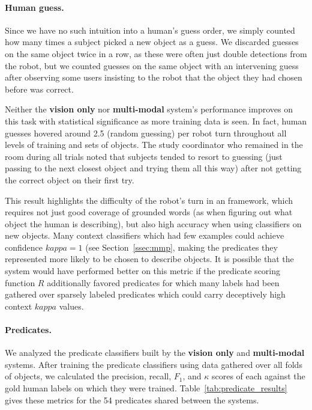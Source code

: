 \paragraph{Human guess.}
Since we have no such intuition into a human's guess order, we simply counted how many times a subject picked a new object as a guess.
We discarded guesses on the same object twice in a row, as these were often just double detections from the robot, but we counted guesses on the same object with an intervening guess after observing some users insisting to the robot that the object they had chosen before was correct.

Neither the \textbf{vision only} nor \textbf{multi-modal} system's performance improves on this task with statistical significance as more training data is seen.
In fact, human guesses hovered around 2.5 (random guessing) per robot turn throughout all levels of training and sets of objects.
The study coordinator who remained in the room during all trials noted that subjects tended to resort to guessing (just passing to the next closest object and trying them all this way) after not getting the correct object on their first try.

This result highlights the difficulty of the robot's turn in an \ispy framework, which requires not just good coverage of grounded words (as when figuring out what object the human is describing), but also high accuracy when using classifiers on new objects.
Many context classifiers which had few examples could achieve confidence $kappa=1$ (see Section~\ref{ssec:mmp}, making the predicates they represented more likely to be chosen to describe objects.
It is possible that the system would have performed better on this metric if the predicate scoring function $R$ additionally favored predicates for which many labels had been gathered over sparsely labeled predicates which could carry deceptively high context $kappa$ values.

\paragraph{Predicates.}
We analyzed the predicate classifiers built by the \textbf{vision only} and \textbf{multi-modal} systems.
After training the predicate classifiers using data gathered over all folds of objects, we calculated the precision, recall, $F_1$, and $\kappa$ scores of each against the gold human labels on which they were trained.
Table~\ref{tab:predicate_results} gives these metrics for the 54 predicates shared between the systems.


